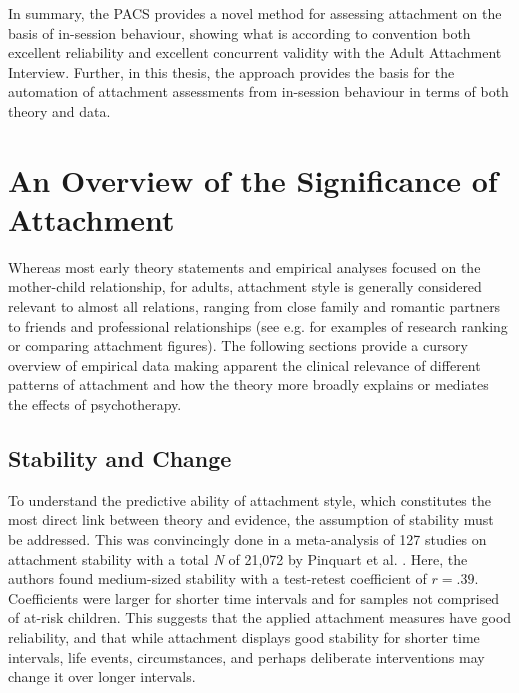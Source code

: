 \documentclass[12pt]{report}
\begin{document}
In summary, the PACS provides a novel method for assessing attachment on the basis of in-session behaviour, showing what is according to convention \cite{Cicchetti1994} both excellent reliability and excellent concurrent validity with the Adult Attachment Interview.
Further, in this thesis, the approach provides the basis for the automation of attachment assessments from in-session behaviour in terms of both theory and data.

\chapter{An Overview of the Significance of Attachment}
\label{sec:theory and review}
Whereas most early theory statements and empirical analyses focused on the mother-child relationship, for adults, attachment style is generally considered relevant to almost all relations, ranging from close family and romantic partners to friends and professional relationships
(see e.g.  for examples of research ranking or comparing attachment figures).
The following sections provide a cursory overview of empirical data making apparent the clinical relevance of different patterns of attachment and how the theory more broadly explains or mediates the effects of psychotherapy.

\section{Stability and Change}
To understand the predictive ability of attachment style, which constitutes the most direct link between theory and evidence, the assumption of stability must be addressed.
This was convincingly done in a meta-analysis of 127 studies on attachment stability with a total \textit{N} of 21,072 by Pinquart et al. \citeyear{Pinquart2013}.
Here, the authors found medium-sized stability with a test-retest coefficient of $r=.39$.
Coefficients were larger for shorter time intervals and for samples not comprised of at-risk children.
This suggests that the applied attachment measures have good reliability, and that while attachment displays good stability for shorter time intervals, life events, circumstances, and perhaps deliberate interventions may change it over longer intervals.
\end{document}
